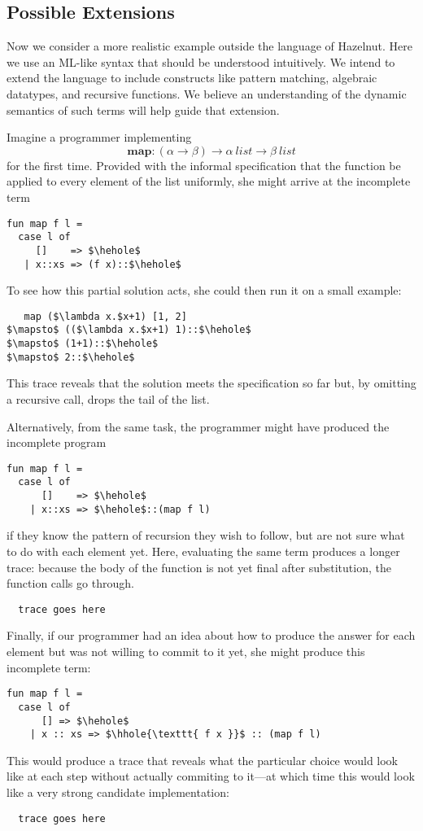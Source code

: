 \subsection{Possible Extensions}
Now we consider a more realistic example outside the language of
Hazelnut. Here we use an ML-like syntax that should be understood
intuitively. We intend to extend the language to include constructs like
pattern matching, algebraic datatypes, and recursive functions. We believe
an understanding of the dynamic semantics of such terms will help guide
that extension.

Imagine a programmer implementing $$\mathbf{map} : (\alpha \to \beta) \to
\alpha ~\mathit{list} \to \beta ~\mathit{list}$$ for the first time.
Provided with the informal specification that the function be applied to
every element of the list uniformly, she might arrive at the incomplete
term
\begin{lstlisting}
fun map f l =
  case l of
     []    => $\hehole$
   | x::xs => (f x)::$\hehole$
\end{lstlisting}
To see how this partial solution acts, she could then run it on a small
example:
\begin{lstlisting}
   map ($\lambda x.$x+1) [1, 2]
$\mapsto$ (($\lambda x.$x+1) 1)::$\hehole$
$\mapsto$ (1+1)::$\hehole$
$\mapsto$ 2::$\hehole$
\end{lstlisting}
This trace reveals that the solution meets the specification so far but, by
omitting a recursive call, drops the tail of the list.


Alternatively, from the same task, the programmer might have produced the
incomplete program
\begin{lstlisting}
fun map f l =
  case l of
      []    => $\hehole$
    | x::xs => $\hehole$::(map f l)
\end{lstlisting}
if they know the pattern of recursion they wish to follow, but are not sure
what to do with each element yet. Here, evaluating the same term produces a
longer trace: because the body of the function is not yet final after
substitution, the function calls go through.
\begin{verbatim}
  trace goes here
\end{verbatim}

Finally, if our programmer had an idea about how to produce the answer for
each element but was not willing to commit to it yet, she might produce
this incomplete term:
\begin{lstlisting}
fun map f l =
  case l of
      [] => $\hehole$
    | x :: xs => $\hhole{\texttt{ f x }}$ :: (map f l)
\end{lstlisting}
This would produce a trace that reveals what the particular choice would
look like at each step without actually commiting to it---at which time
this would look like a very strong candidate implementation:
\begin{verbatim}
  trace goes here
\end{verbatim}
